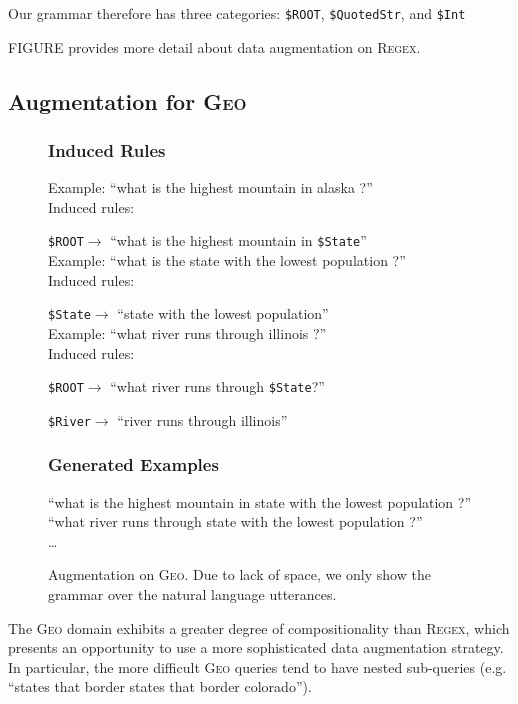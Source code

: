 \documentclass[11pt,letterpaper]{article}
\newcommand{\regex}{\textsc{Regex}\xspace}
\newcommand{\geo}{\textsc{Geo}\xspace}
\newcommand{\catroot}{\texttt{\$ROOT}\xspace}
\newcommand{\catstate}{\texttt{\$State}\xspace}
\newcommand{\catriver}{\texttt{\$River}\xspace}
\begin{document}
Our grammar therefore has three categories: 
\texttt{\$ROOT}, \texttt{\$QuotedStr}, and \texttt{\$Int}

FIGURE provides more detail about data augmentation on \regex.

\subsection{Augmentation for \geo}
\begin{figure}[t] 
\begin{framed}
\subsubsection*{Induced Rules}
Example: ``what is the highest mountain in alaska ?''\\
Induced rules:

\qquad \catroot $\to$ ``what is the highest mountain in \catstate ''\\

Example: ``what is the state with the lowest population ?''\\
Induced rules:

\qquad \catstate $\to$ ``state with the lowest population''\\

Example: ``what river runs through illinois ?''\\
Induced rules:

\qquad \catroot $\to$ ``what river runs through \catstate ?''

\qquad \catriver $\to$ ``river runs through illinois''

\subsubsection*{Generated Examples} 
``what is the highest mountain in state with the lowest population ?'' \\
``what river runs through state with the lowest population ?'' \\
\dots
\end{framed}
\caption{Augmentation on \geo.  Due to lack of space,
we only show the grammar over the natural language utterances.}
\label{fig:overview}
\end{figure}

The \geo domain exhibits a greater degree of compositionality
than \regex, which presents an opportunity to use a more sophisticated
data augmentation strategy.
In particular, the more difficult \geo queries tend to have
nested sub-queries (e.g. ``states that border states that border colorado'').
\end{document}
